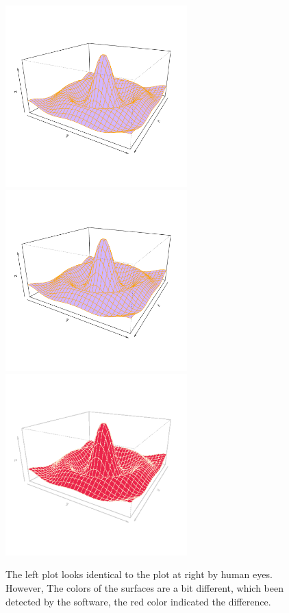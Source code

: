 \documentclass[11pt,twoside]{report}
\begin{document}
\begin{figure}[h!]
	\begin{center}
		\includegraphics[height = 7cm, width = 7cm]{figure/Chapter5_example_01.pdf}
		\includegraphics[height = 7cm, width = 7cm]{figure/Chapter5_example_02.pdf}
		\includegraphics[height = 7cm, width = 7cm]{figure/Chapter5_example_03.pdf}
		\caption{The left plot looks identical to the plot at right by human eyes. However, The colors of the surfaces are a bit different, which been detected by the software, the red color indicated the difference.}
		\label{chapter5.1}
	\end{center}
\end{figure}
\end{document}
